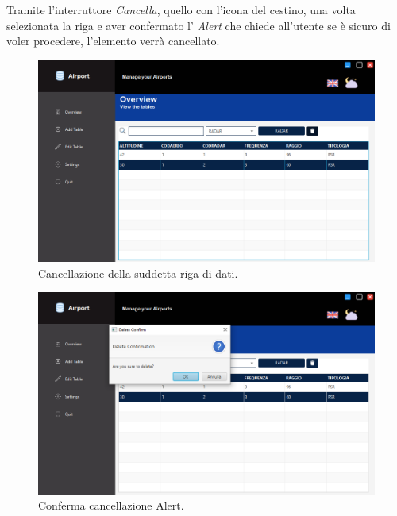 \textsf{\small Tramite l'interruttore \emph{Cancella}, quello con l'icona del cestino, una volta selezionata la riga e aver confermato l' \emph{Alert} che chiede all'utente se è sicuro di voler procedere, l'elemento verrà cancellato.}

\begin{figure}[H] 
	\centering
	\includegraphics[width=1\textwidth, height=1\textheight, keepaspectratio]{./img/Applicativo/delete_data.png}
	\caption{Cancellazione della suddetta riga di dati.}
	\label{fig:delete_data}
\end{figure}

\pagebreak

\begin{figure}[H] 
	\centering
	\includegraphics[width=1\textwidth, height=1\textheight, keepaspectratio]{./img/Applicativo/delete_alert_confirmation.png}
	\caption{Conferma cancellazione Alert.}
	\label{fig:delete_alert_confirmation}
\end{figure}



